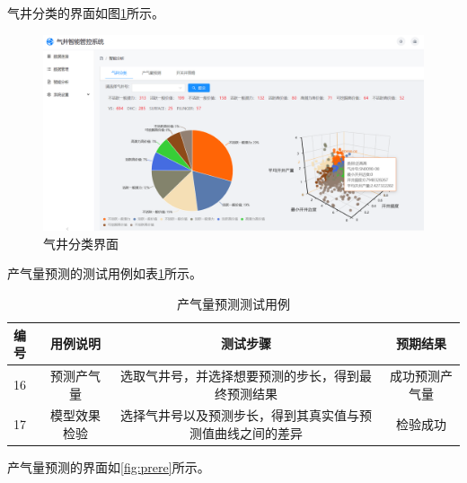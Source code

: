 气井分类的界面如图\ref{fig:clusterre}所示。

\begin{figure}
    \centering
    \includegraphics{figure/气井分类.jpg}
    \caption{气井分类界面}
    \label{fig:clusterre}
\end{figure}

产气量预测的测试用例如表\ref{tab:predite}所示。

\begin{table}
    \renewcommand{\arraystretch}{1.5}
    \centering
    \caption{产气量预测测试用例}
    \begin{tabular}{|l|c|c|c|}
        \hline
        编号 & 用例说明 & 测试步骤 & 预期结果 \\
        \hline
        16 & 预测产气量 & 选取气井号，并选择想要预测的步长，得到最终预测结果 & 成功预测产气量 \\
        \hline
        17 & 模型效果检验 & 选择气井号以及预测步长，得到其真实值与预测值曲线之间的差异 & 检验成功 \\
        \hline
    \end{tabular}
    \label{tab:predite}
\end{table}

产气量预测的界面如\ref{fig:prere}所示。

